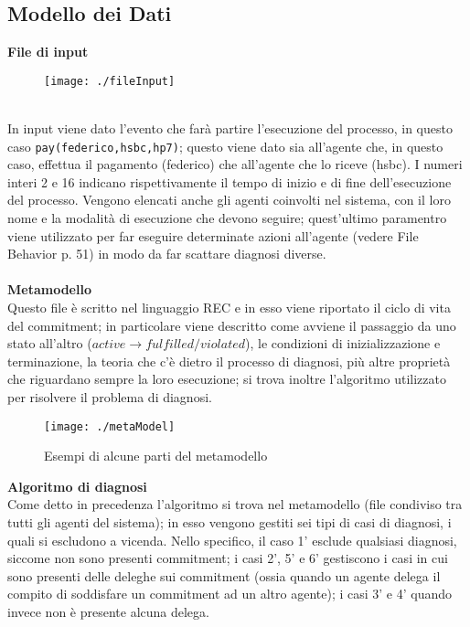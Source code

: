 \documentclass[a4paper,12pt]{report}
\begin{document}
\subsection{Modello dei Dati}
\textbf{File di input}
\begin{figure}[h]
    \texttt{[image: ./fileInput]}
\end{figure}
\\In input viene dato l'evento che farà partire l'esecuzione del processo, in questo caso \texttt{pay(federico,hsbc,hp7)}; questo viene dato sia all'agente che, in questo caso, effettua il pagamento (federico) che all'agente che lo riceve (hsbc). I numeri interi 2 e 16 indicano rispettivamente il tempo di inizio e di fine dell'esecuzione del processo. Vengono elencati anche gli agenti coinvolti nel sistema, con il loro nome e la modalità di esecuzione che devono seguire; quest'ultimo paramentro viene utilizzato per far eseguire determinate azioni all'agente (vedere File Behavior p. 51) in modo da far scattare diagnosi diverse.\\
\\\textbf{Metamodello}\\
Questo file è scritto nel linguaggio REC e in esso viene riportato il ciclo di vita del commitment; in particolare viene descritto come avviene il passaggio da uno stato all'altro ($active \rightarrow fulfilled/violated$), le condizioni di inizializzazione e terminazione, la teoria che c'è dietro il processo di diagnosi, più altre proprietà che riguardano sempre la loro esecuzione; si trova inoltre l'algoritmo utilizzato per risolvere il problema di diagnosi.
\begin{figure}[h]
    \begin{center}
        \texttt{[image: ./metaModel]}
        \caption{Esempi di alcune parti del metamodello}
    \end{center}
\end{figure}
\newpage
\textbf{Algoritmo di diagnosi}\\
Come detto in precedenza l'algoritmo si trova nel metamodello (file condiviso tra tutti gli agenti del sistema); in esso vengono gestiti sei tipi di casi di diagnosi, i quali si escludono a vicenda. Nello specifico, il caso 1' esclude qualsiasi diagnosi, siccome non sono presenti commitment; i casi 2', 5' e 6' gestiscono i casi in cui sono presenti delle deleghe sui commitment (ossia quando un agente delega il compito di soddisfare un commitment ad un altro agente); i casi 3' e 4' quando invece non è presente alcuna delega.
\end{document}
